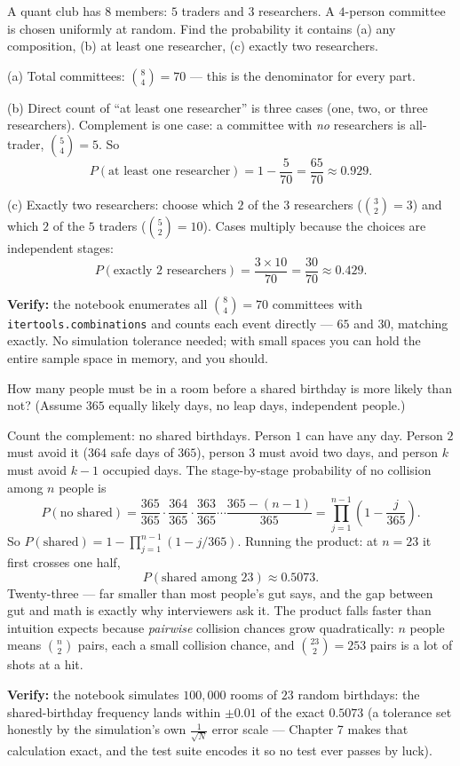 \begin{worked}\label{wk:committee}
A quant club has $8$ members: $5$ traders and $3$ researchers. A $4$-person committee is chosen uniformly at random. Find the probability it contains (a) any composition, (b) at least one researcher, (c) exactly two researchers.

(a) Total committees: $\binom{8}{4} = 70$ --- this is the denominator for every part.

(b) Direct count of ``at least one researcher'' is three cases (one, two, or three researchers). Complement is one case: a committee with \emph{no} researchers is all-trader, $\binom{5}{4} = 5$. So
\[
P(\text{at least one researcher}) = 1 - \frac{5}{70} = \frac{65}{70} \approx 0.929.
\]

(c) Exactly two researchers: choose which $2$ of the $3$ researchers ($\binom{3}{2} = 3$) and which $2$ of the $5$ traders ($\binom{5}{2} = 10$). Cases multiply because the choices are independent stages:
\[
P(\text{exactly 2 researchers}) = \frac{3 \times 10}{70} = \frac{30}{70} \approx 0.429.
\]

\textbf{Verify:} the notebook enumerates all $\binom{8}{4} = 70$ committees with \texttt{itertools.combinations} and counts each event directly --- $65$ and $30$, matching exactly. No simulation tolerance needed; with small spaces you can hold the entire sample space in memory, and you should.
\end{worked}

\begin{worked}\label{wk:birthday}
How many people must be in a room before a shared birthday is more likely than not? (Assume $365$ equally likely days, no leap days, independent people.)

Count the complement: no shared birthdays. Person $1$ can have any day. Person $2$ must avoid it ($364$ safe days of $365$), person $3$ must avoid two days, and person $k$ must avoid $k-1$ occupied days. The stage-by-stage probability of no collision among $n$ people is
\[
P(\text{no shared}) = \frac{365}{365} \cdot \frac{364}{365} \cdot \frac{363}{365} \cdots \frac{365 - (n-1)}{365} = \prod_{j=1}^{n-1}\left(1 - \frac{j}{365}\right).
\]
So $P(\text{shared}) = 1 - \prod_{j=1}^{n-1}(1 - j/365)$. Running the product: at $n = 23$ it first crosses one half,
\[
P(\text{shared among 23}) \approx 0.5073.
\]
Twenty-three --- far smaller than most people's gut says, and the gap between gut and math is exactly why interviewers ask it. The product falls faster than intuition expects because \emph{pairwise} collision chances grow quadratically: $n$ people means $\binom{n}{2}$ pairs, each a small collision chance, and $\binom{23}{2} = 253$ pairs is a lot of shots at a hit.

\textbf{Verify:} the notebook simulates $100{,}000$ rooms of $23$ random birthdays: the shared-birthday frequency lands within $\pm 0.01$ of the exact $0.5073$ (a tolerance set honestly by the simulation's own $\tfrac{1}{\sqrt{N}}$ error scale --- Chapter 7 makes that calculation exact, and the test suite encodes it so no test ever passes by luck).
\end{worked}

